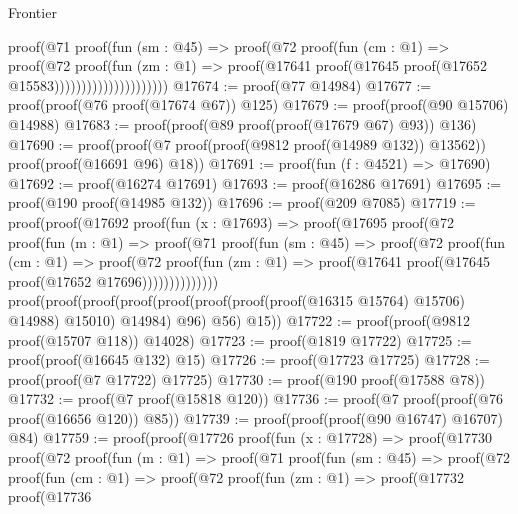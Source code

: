 \begin{lexlean}{Frontier}
\begin{coremodule}
                              proof(@71
                                  proof(fun (sm : @45) =>
                                    proof(@72
                                        proof(fun (cm : @1) =>
                                          proof(@72
                                              proof(fun (zm : @1) =>
                                                proof(@17641
                                                    proof(@17645
                                                        proof(@17652 @15583)))))))))))))))))))))
@17674 := proof(@77 @14984)
@17677 := proof(proof(@76 proof(@17674 @67)) @125)
@17679 := proof(proof(@90 @15706) @14988)
@17683 := proof(proof(@89 proof(proof(@17679 @67) @93)) @136)
@17690 := proof(proof(@7 proof(proof(@9812 proof(@14989 @132)) @13562))
      proof(proof(@16691 @96) @18))
@17691 := proof(fun (f : @4521) => @17690)
@17692 := proof(@16274 @17691)
@17693 := proof(@16286 @17691)
@17695 := proof(@190 proof(@14985 @132))
@17696 := proof(@209 @7085)
@17719 := proof(proof(@17692
        proof(fun (x : @17693) =>
          proof(@17695
              proof(@72
                  proof(fun (m : @1) =>
                    proof(@71
                        proof(fun (sm : @45) =>
                          proof(@72
                              proof(fun (cm : @1) =>
                                proof(@72
                                    proof(fun (zm : @1) =>
                                      proof(@17641 proof(@17645 proof(@17652 @17696))))))))))))))
      proof(proof(proof(proof(proof(proof(proof(proof(@16315 @15764) @15706) @14988) @15010) @14984)
              @96)
            @56)
          @15))
@17722 := proof(proof(@9812 proof(@15707 @118)) @14028)
@17723 := proof(@1819 @17722)
@17725 := proof(proof(@16645 @132) @15)
@17726 := proof(@17723 @17725)
@17728 := proof(proof(@7 @17722) @17725)
@17730 := proof(@190 proof(@17588 @78))
@17732 := proof(@7 proof(@15818 @120))
@17736 := proof(@7 proof(proof(@76 proof(@16656 @120)) @85))
@17739 := proof(proof(proof(@90 @16747) @16707) @84)
@17759 := proof(proof(@17726
        proof(fun (x : @17728) =>
          proof(@17730
              proof(@72
                  proof(fun (m : @1) =>
                    proof(@71
                        proof(fun (sm : @45) =>
                          proof(@72
                              proof(fun (cm : @1) =>
                                proof(@72
                                    proof(fun (zm : @1) =>
                                      proof(@17732
                                          proof(@17736

\end{coremodule}
\end{lexlean}
